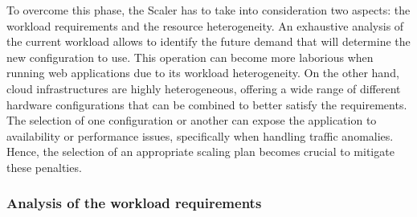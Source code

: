 
To overcome this phase, the Scaler has to take into consideration two aspects: the workload requirements and the resource heterogeneity. An exhaustive analysis of the current workload allows to identify the future demand that will determine the new configuration to use. This operation can become more laborious when running web applications due to its workload heterogeneity. On the other hand, cloud infrastructures are highly heterogeneous, offering a wide range of different hardware configurations that can be combined to better satisfy the requirements. The selection of one configuration or another can expose the application to availability or performance issues, specifically when handling traffic anomalies. Hence, the selection of an appropriate scaling plan becomes crucial to mitigate these penalties. 








\subsubsection{Analysis of the workload requirements}

